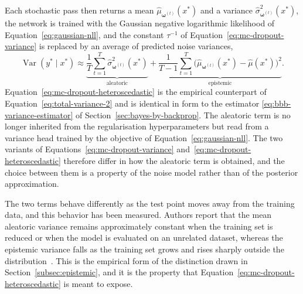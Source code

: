Each stochastic pass then returns a mean $\hat{\mu}_{\boldsymbol{\omega}^{(t)}}(x^\ast)$ and a variance
$\hat{\sigma}^2_{\boldsymbol{\omega}^{(t)}}(x^\ast)$, the network is trained with the Gaussian negative logarithmic likelihood of Equation~\eqref{eq:gaussian-nll}, and the constant $\tau^{-1}$ of Equation~\eqref{eq:mc-dropout-variance} is replaced by an average of predicted noise variances,
%
\begin{equation}
    \operatorname{Var}\!\left(y^\ast \mid x^\ast\right)
    \approx
    \underbrace{\frac{1}{T} \sum_{t=1}^{T}
      \hat{\sigma}^2_{\boldsymbol{\omega}^{(t)}}(x^\ast)}_{\text{aleatoric}}
    +
    \underbrace{\frac{1}{T-1} \sum_{t=1}^{T}
      \bigl( \hat{\mu}_{\boldsymbol{\omega}^{(t)}}(x^\ast)
             - \hat{\mu}(x^\ast) \bigr)^2}_{\text{epistemic}} .
    \label{eq:mc-dropout-heteroscedastic}
\end{equation}
%
Equation~\eqref{eq:mc-dropout-heteroscedastic} is the empirical counterpart of
Equation~\eqref{eq:total-variance-2} and is identical in form to the estimator
\eqref{eq:bbb-variance-estimator} of Section~\ref{sec:bayes-by-backprop}. The
aleatoric term is no longer inherited from the regularisation hyperparameters
but read from a variance head trained by the objective of
Equation~\eqref{eq:gaussian-nll}. The two variants of
Equations~\eqref{eq:mc-dropout-variance}
and~\eqref{eq:mc-dropout-heteroscedastic} therefore differ in how the aleatoric
term is obtained, and the choice between them is a property of the noise model
rather than of the posterior approximation.


The two terms behave differently as the test point moves away from the training
data, and this behavior has been measured. Authors report that the mean aleatoric variance remains approximately constant when the training set is reduced or when the model is evaluated on an unrelated dataset, whereas the epistemic variance falls as the training set grows and rises sharply outside the distribution~\cite{kendall2017}. This is the empirical form of the distinction
drawn in Section~\ref{subsec:epistemic}, and it is the property that Equation~\eqref{eq:mc-dropout-heteroscedastic} is meant to expose.

